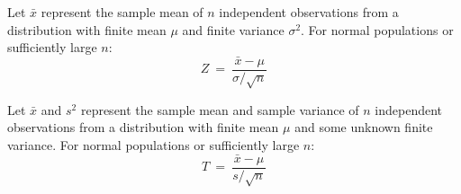 \documentclass{article}
\newcommand{\HRule}{\rule{\linewidth}{0.25mm}}
\newcommand{\HRuleLight}{\rule{\linewidth}{0.1mm}}
\begin{document}
Let $\bar{x}$ represent the sample mean of $n$ independent observations from a distribution with finite mean $\mu$  
and finite variance $\sigma^2$.
For normal populations or sufficiently large $n$:
\begin{equation*}
        Z ~=~ \frac{\displaystyle \bar{x} - \mu }{ \displaystyle \sigma / \sqrt{n}}
\end{equation*}

Let $\bar{x}$ and $s^2$ represent the sample mean and sample variance of $n$ independent observations from a distribution with finite mean $\mu$ and some unknown finite variance.
For normal populations or sufficiently large $n$:
\begin{equation*}
        T ~=~ \frac{\displaystyle \bar{x} - \mu }{ \displaystyle s / \sqrt{n}}
\end{equation*}


%
%
%
%
\end{document}
